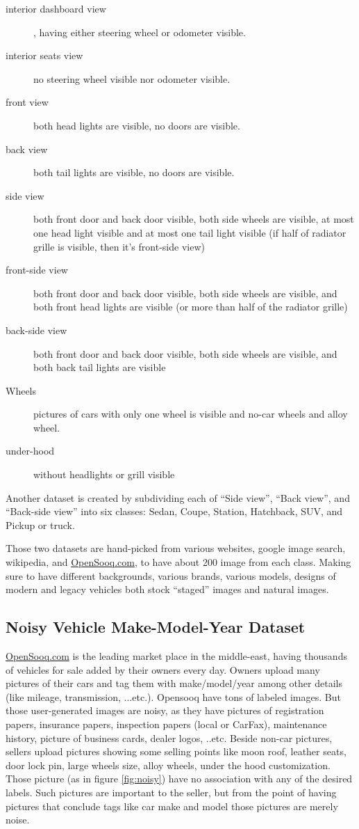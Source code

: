 \begin{description}
\item [interior dashboard view], having either steering wheel or odometer visible.
\item [interior seats view] no steering wheel visible nor odometer visible.
\item [front view] both head lights are visible, no doors are visible.
\item [back view] both tail lights are visible, no doors are visible.
\item [side view] both front door and back door visible, both side wheels are visible,
at most one head light visible and at most one tail light visible (if half of radiator grille is visible, then it's front-side view)
\item [front-side view] both front door and back door visible, both side wheels are visible, and both front head lights are visible (or more than half of the radiator grille)
\item [back-side view] both front door and back door visible, both side wheels are visible, and both back tail lights are visible
\item [Wheels] pictures of cars with only one wheel is visible and no-car wheels and alloy wheel.
\item [under-hood]  without headlights or grill visible
\end{description}

Another dataset is created by subdividing each of ``Side view'', ``Back view'', and ``Back-side view'' into six classes:
Sedan, Coupe, Station, Hatchback, SUV, and Pickup or truck.

Those two datasets are hand-picked from various websites, google image search, wikipedia,
and \href{http://opensooq.com}{OpenSooq.com}, to have about 200 image from each class.
Making sure to have different backgrounds, various brands, various models, designs of modern and legacy vehicles
both stock ``staged'' images and natural images.

\subsection{Noisy Vehicle Make-Model-Year Dataset}

\href{http://opensooq.com}{OpenSooq.com} is the leading market place in the middle-east,
having thousands of vehicles for sale added by their owners every day.
Owners upload many pictures of their cars and tag them with make/model/year
among other details (like mileage, transmission, ...etc.).
Opensooq have tons of labeled images. But those user-generated images are noisy,
as they have pictures of registration papers, insurance papers,
inspection papers (local or CarFax), maintenance history, picture of business cards, dealer logos, ..etc.
Beside non-car pictures, sellers upload pictures showing some selling points
like moon roof, leather seats, door lock pin, large wheels size, alloy wheels, under the hood customization.
Those picture (as in figure \ref{fig:noisy}) have no association with any of the desired labels.
Such pictures are important to the seller, but from the point of having pictures that conclude tags like car make and model
those pictures are merely noise.

